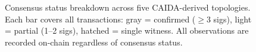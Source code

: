 \begin{figure}[t]

\caption{Consensus status breakdown across five CAIDA-derived topologies.
Each bar covers all transactions: gray = confirmed ($\geq$3 sigs),
light = partial (1--2 sigs), hatched = single witness.
All observations are recorded on-chain regardless of consensus status.}
\label{fig:consensus_breakdown}
\end{figure}


